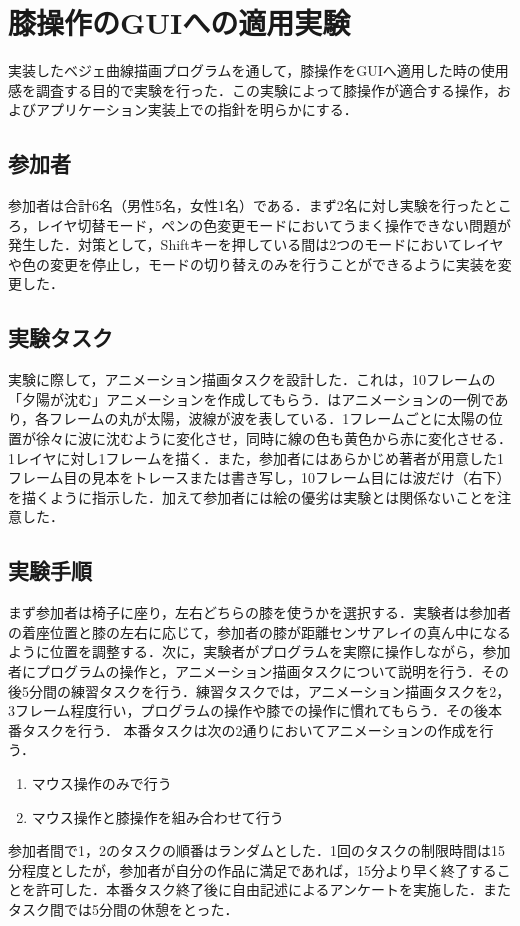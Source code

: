 \documentclass[submit, techrep]{ipsj}
\begin{document}
\section{膝操作のGUIへの適用実験}
実装したベジェ曲線描画プログラムを通して，膝操作をGUIへ適用した時の使用感を調査する目的で実験を行った．この実験によって膝操作が適合する操作，およびアプリケーション実装上での指針を明らかにする．
\subsection{参加者}
参加者は合計6名（男性5名，女性1名）である．まず2名に対し実験を行ったところ，レイヤ切替モード，ペンの色変更モードにおいてうまく操作できない問題が発生した．対策として，Shiftキーを押している間は2つのモードにおいてレイヤや色の変更を停止し，モードの切り替えのみを行うことができるように実装を変更した．
\subsection{実験タスク}
実験に際して，アニメーション描画タスクを設計した．これは，10フレームの「夕陽が沈む」アニメーションを作成してもらう．はアニメーションの一例であり，各フレームの丸が太陽，波線が波を表している．1フレームごとに太陽の位置が徐々に波に沈むように変化させ，同時に線の色も黄色から赤に変化させる．1レイヤに対し1フレームを描く．また，参加者にはあらかじめ著者が用意した1フレーム目の見本をトレースまたは書き写し，10フレーム目には波だけ（右下）を描くように指示した．加えて参加者には絵の優劣は実験とは関係ないことを注意した．
\subsection{実験手順}
まず参加者は椅子に座り，左右どちらの膝を使うかを選択する．実験者は参加者の着座位置と膝の左右に応じて，参加者の膝が距離センサアレイの真ん中になるように位置を調整する．次に，実験者がプログラムを実際に操作しながら，参加者にプログラムの操作と，アニメーション描画タスクについて説明を行う．その後5分間の練習タスクを行う．練習タスクでは，アニメーション描画タスクを2，3フレーム程度行い，プログラムの操作や膝での操作に慣れてもらう．その後本番タスクを行う．
本番タスクは次の2通りにおいてアニメーションの作成を行う．
\begin{enumerate}
	\item マウス操作のみで行う
	\item マウス操作と膝操作を組み合わせて行う
\end{enumerate}
参加者間で1，2のタスクの順番はランダムとした．1回のタスクの制限時間は15分程度としたが，参加者が自分の作品に満足であれば，15分より早く終了することを許可した．本番タスク終了後に自由記述によるアンケートを実施した．またタスク間では5分間の休憩をとった．
\end{document}
